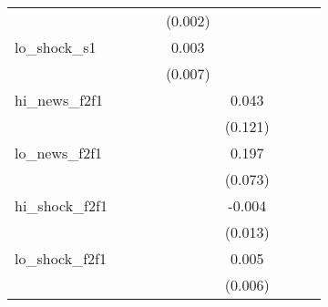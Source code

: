 {\begin{tabular}{l*{8}{c}}
            &                     &                     &                     &     (0.002)         &                     &                     &                     &                     \\
\addlinespace
lo\_shock\_s1 &                     &                     &                     &       0.003         &                     &                     &                     &                     \\
            &                     &                     &                     &     (0.007)         &                     &                     &                     &                     \\
\addlinespace
hi\_news\_f2f1&                     &                     &                     &                     &       0.043         &                     &                     &                     \\
            &                     &                     &                     &                     &     (0.121)         &                     &                     &                     \\
\addlinespace
lo\_news\_f2f1&                     &                     &                     &                     &       0.197\sym{***}&                     &                     &                     \\
            &                     &                     &                     &                     &     (0.073)         &                     &                     &                     \\
\addlinespace
hi\_shock\_f2f1&                     &                     &                     &                     &      -0.004         &                     &                     &                     \\
            &                     &                     &                     &                     &     (0.013)         &                     &                     &                     \\
\addlinespace
lo\_shock\_f2f1&                     &                     &                     &                     &       0.005         &                     &                     &                     \\
            &                     &                     &                     &                     &     (0.006)         &                     &                     &                     \\

\end{tabular}}
